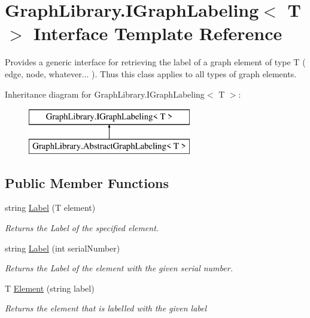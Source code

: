 \hypertarget{interface_graph_library_1_1_i_graph_labeling}{}\section{Graph\+Library.\+I\+Graph\+Labeling$<$ T $>$ Interface Template Reference}
\label{interface_graph_library_1_1_i_graph_labeling}


Provides a generic interface for retrieving the label of a graph element of type T ( edge, node, whatever... ). Thus this class applies to all types of graph elements.  


Inheritance diagram for Graph\+Library.\+I\+Graph\+Labeling$<$ T $>$\+:\begin{figure}[H]
\begin{center}
\leavevmode
\includegraphics[height=2.000000cm]{interface_graph_library_1_1_i_graph_labeling}
\end{center}
\end{figure}
\subsection*{Public Member Functions}
\begin{DoxyCompactItemize}
\item 
string \hyperlink{interface_graph_library_1_1_i_graph_labeling_a72391788639c686dbb02bc135b4d2b68}{Label} (T element)
\begin{DoxyCompactList}\small\item\em Returns the Label of the specified element. \end{DoxyCompactList}\item 
string \hyperlink{interface_graph_library_1_1_i_graph_labeling_aa889d08a24d32a78bd464f4c98b53344}{Label} (int serial\+Number)
\begin{DoxyCompactList}\small\item\em Returns the Label of the element with the given serial number. \end{DoxyCompactList}\item 
T \hyperlink{interface_graph_library_1_1_i_graph_labeling_a155203509c4489593811ec7520e72a13}{Element} (string label)
\begin{DoxyCompactList}\small\item\em Returns the element that is labelled with the given label \end{DoxyCompactList}\end{DoxyCompactItemize}


